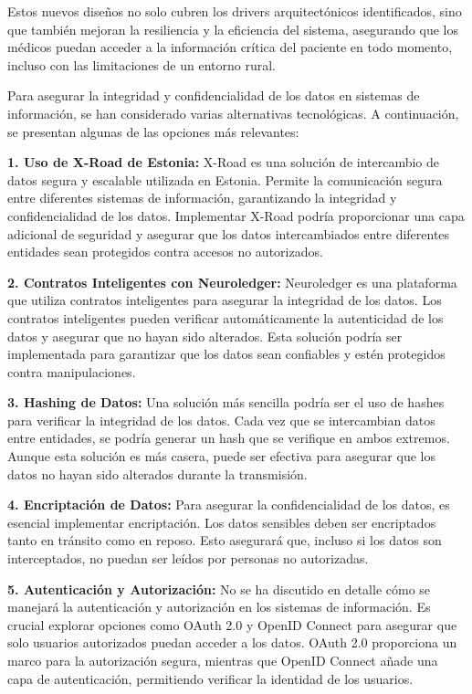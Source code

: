 Estos nuevos diseños no solo cubren los drivers arquitectónicos identificados, sino que también mejoran la resiliencia y la eficiencia del sistema, asegurando que los médicos puedan acceder a la información crítica del paciente en todo momento, incluso con las limitaciones de un entorno rural.


Para asegurar la integridad y confidencialidad de los datos en sistemas de información, se han considerado varias alternativas tecnológicas. A continuación, se presentan algunas de las opciones más relevantes:

\textbf{1. Uso de X-Road de Estonia:}
X-Road es una solución de intercambio de datos segura y escalable utilizada en Estonia. Permite la comunicación segura entre diferentes sistemas de información, garantizando la integridad y confidencialidad de los datos. Implementar X-Road podría proporcionar una capa adicional de seguridad y asegurar que los datos intercambiados entre diferentes entidades sean protegidos contra accesos no autorizados.

\textbf{2. Contratos Inteligentes con Neuroledger:}
Neuroledger es una plataforma que utiliza contratos inteligentes para asegurar la integridad de los datos. Los contratos inteligentes pueden verificar automáticamente la autenticidad de los datos y asegurar que no hayan sido alterados. Esta solución podría ser implementada para garantizar que los datos sean confiables y estén protegidos contra manipulaciones.

\textbf{3. Hashing de Datos:}
Una solución más sencilla podría ser el uso de hashes para verificar la integridad de los datos. Cada vez que se intercambian datos entre entidades, se podría generar un hash que se verifique en ambos extremos. Aunque esta solución es más casera, puede ser efectiva para asegurar que los datos no hayan sido alterados durante la transmisión.

\textbf{4. Encriptación de Datos:}
Para asegurar la confidencialidad de los datos, es esencial implementar encriptación. Los datos sensibles deben ser encriptados tanto en tránsito como en reposo. Esto asegurará que, incluso si los datos son interceptados, no puedan ser leídos por personas no autorizadas.

\textbf{5. Autenticación y Autorización:}
No se ha discutido en detalle cómo se manejará la autenticación y autorización en los sistemas de información. Es crucial explorar opciones como OAuth 2.0 y OpenID Connect para asegurar que solo usuarios autorizados puedan acceder a los datos. OAuth 2.0 proporciona un marco para la autorización segura, mientras que OpenID Connect añade una capa de autenticación, permitiendo verificar la identidad de los usuarios.

